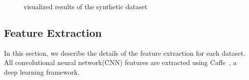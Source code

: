 \documentclass[letterpaper]{article}
\begin{document}
\begin{figure}[htp]
\center
    \caption{visualized results of the synthetic dataset} \label{fig:ensemble_cluster}
\end{figure}


\subsection{Feature Extraction}
In this section, we describe the details of the feature extraction for each dataset. 
All convolutional neural network(CNN) features are extracted using Caffe~\cite{jia2014caffe}, a deep learning framework.
\end{document}
